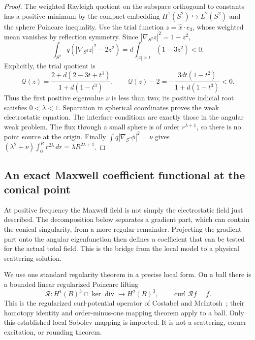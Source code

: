\begin{proof}
The weighted Rayleigh quotient on the subspace orthogonal to constants
has a positive minimum by the compact embedding
$H^1(S^2)\hookrightarrow L^2(S^2)$ and the sphere Poincare inequality.
Use the trial function $z=\widehat x\cdot e_3$, whose weighted mean
vanishes by reflection symmetry.  Since
$|\nabla_{S^2}z|^2=1-z^2$,
\begin{equation}
 \int_{S^2}q(|\nabla_{S^2}z|^2-2z^2)
 =d\int_{|z|>t}(1-3z^2)<0.
 \label{hs:three-trial}
\end{equation}
Explicitly, the trial quotient is
\begin{equation}
 \mathcal Q(z)=\frac{2+d(2-3t+t^3)}{1+d(1-t^3)},\qquad
 \mathcal Q(z)-2=-\frac{3dt(1-t^2)}{1+d(1-t^3)}<0.
 \label{hs:three-trial-explicit}
\end{equation}
Thus the first positive eigenvalue $\nu$ is less than two; its
positive indicial root satisfies $0<\lambda<1$.  Separation in
spherical coordinates proves the weak electrostatic equation.
The interface conditions are exactly those in the angular weak
problem.  The flux through a small sphere is of order
$r^{\lambda+1}$, so there is no point source at the origin.
Finally $\int q|\nabla_{S^2}\phi|^2=\nu$ gives
$(\lambda^2+\nu)\int_0^Rr^{2\lambda}\,dr
=\lambda R^{2\lambda+1}$.
\end{proof}

\subsection{An exact Maxwell coefficient functional at the conical point}
\label{hs:three-functional-subsection}

At positive frequency the Maxwell field is not simply the electrostatic
field just described.  The decomposition below separates a gradient
part, which can contain the conical singularity, from a more regular
remainder.  Projecting the gradient part onto the angular eigenfunction
then defines a coefficient that can be tested for the actual total field.
This is the bridge from the local model to a physical scattering solution.

We use one standard regularity theorem in a precise local form.  On a
ball there is a bounded linear regularized Poincare lifting
\begin{equation}
 \mathcal R:H^1(B)^3\cap\ker\operatorname{div}\longrightarrow H^2(B)^3,
 \qquad \operatorname{curl}\mathcal R f=f.
 \label{hs:three-lifting}
\end{equation}
This is the regularized curl-potential operator of
Costabel and McIntosh~\cite{costabelMcIntosh2010}; their homotopy
identity and order-minus-one mapping theorem apply to a ball.
Only this established local Sobolev mapping is imported.  It is not
a scattering, corner-excitation, or rounding theorem.

